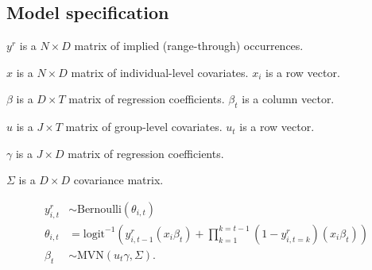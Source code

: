 \documentclass[12pt,letterpaper]{article}
\begin{document}


\subsection*{Model specification}


\(y^{r}\) is a \(N \times D\) matrix of implied (range-through) occurrences.

\(x\) is a \(N \times D\) matrix of individual-level covariates. \(x_{i}\) is a row vector.

\(\beta\) is a \(D \times T\) matrix of regression coefficients. \(\beta_{t}\) is a column vector.

\(u\) is a \(J \times T\) matrix of group-level covariates. \(u_{t}\) is a row vector.

\(\gamma\) is a \(J \times D\) matrix of regression coefficients.

\(\Sigma\) is a \(D \times D\) covariance matrix.

\begin{equation}
  \begin{aligned}
    y^{r}_{i,t} &\sim \text{Bernoulli}(\theta_{i,t}) \\
    \theta_{i, t} &= \text{logit}^{-1}(y^{r}_{i, t - 1} (x_{i} \beta_{t}) + \prod_{k = 1}^{k = t - 1}(1 - y^{r}_{i, t = k}) (x_{i} \beta_{t})) \\
    \beta_{t} &\sim \text{MVN}(u_{t} \gamma, \Sigma). \\
  \end{aligned}
  \label{<++>}
\end{equation}
\end{document}
